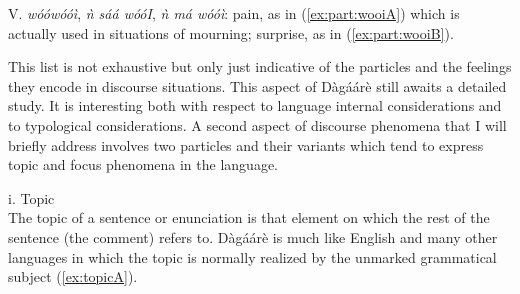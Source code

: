\begin{refsection}
\noindent V. \textit{wóówóóì}, \textit{ǹ sáá wóóI}, \textit{ǹ má wóóì}: pain, as in (\ref{ex:part:wooiA}) which is actually used in situations
of mourning; surprise, as in (\ref{ex:part:wooiB}).


\ea {}
\z\z 

This list is not exhaustive but only just indicative of the particles and the feelings they encode
in discourse situations. This aspect of Dàgáárè still awaits a detailed study. It is interesting
both with respect to language internal considerations and to typological considerations.
A second aspect of discourse phenomena that I will briefly address involves two
particles and their variants which tend to express topic and focus phenomena in the language.\bigskip

\noindent i. Topic\\ 

The topic of a sentence or enunciation is that element on which the rest of the sentence
(the comment) refers to. Dàgáárè is much like English and many other languages in which
the topic is normally realized by the unmarked grammatical subject (\ref{ex:topicA}).

\ea {}
\z\z


\ea {}
\z\z 


\end{refsection}
